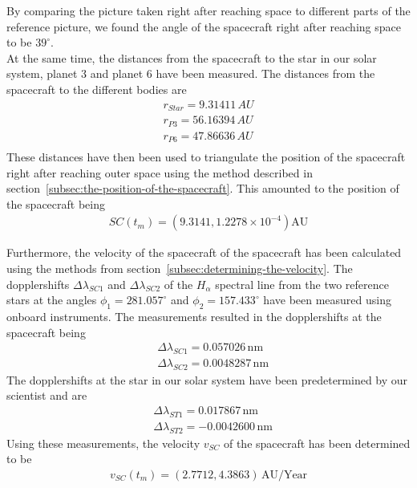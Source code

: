 \documentclass[reprint,english,notitlepage]{revtex4-2}
\begin{document}
By comparing the picture taken right after reaching space to different parts of the reference picture, we found the angle of the spacecraft right after reaching space to be $39^{\circ}$.\\

At the same time, the distances from the spacecraft to the star in our solar system, planet 3 and planet 6 have been measured.
The distances from the spacecraft to the different bodies are
\begin{align*}
    r_{Star} = 9.31411 \,AU\\
	r_{P3} = 56.16394 \,AU\\
	r_{P6} = 47.86636 \,AU\\
\end{align*}
These distances have then been used to triangulate the position of the spacecraft right after reaching outer space using the method described in section~\ref{subsec:the-position-of-the-spacecraft}.
This amounted to the position of the spacecraft being
\begin{align}
    SC(t_m) = (9.3141, 1.2278 \times 10^{-4}) \text{AU} \label{pos_results}
\end{align}

Furthermore, the velocity of the spacecraft of the spacecraft has been calculated using the methods from section~\ref{subsec:determining-the-velocity}.
The dopplershifts $\Delta\lambda_{SC1}$ and $\Delta\lambda_{SC2}$ of the $H_{\alpha}$ spectral line from the two reference stars at the angles $ \phi_1 = 281.057^{\circ}$ and $ \phi_2 = 157.433^{\circ}$ have been measured using onboard instruments.
The measurements resulted in the dopplershifts at the spacecraft being
\begin{align*}
	&\Delta\lambda_{SC1} = 0.057026 \,\text{nm}\\
	&\Delta\lambda_{SC2} = 0.0048287 \,\text{nm}
\end{align*}
The dopplershifts at the star in our solar system have been predetermined by our scientist and are
\begin{align*}
    &\Delta\lambda_{ST1} = 0.017867 \,\text{nm}\\
	&\Delta\lambda_{ST2} = -0.0042600 \,\text{nm}
\end{align*}
Using these measurements, the velocity $v_{SC}$ of the spacecraft has been determined to be
\begin{align}
    v_{SC}(t_m) = (2.7712, 4.3863) \,\text{AU/Year} \label{vel_results}
\end{align}
\end{document}

